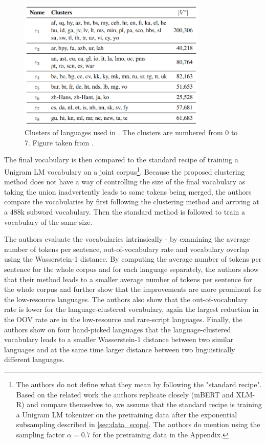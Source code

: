 \begin{figure}[ht]
    \centering
    \includegraphics[width=0.8\textwidth]{img/temp/chung_clusters.png}
    \caption{Clusters of languages used in \cite{chung_improving_2020}. The clusters are numbered from 0 to 7. Figure taken from \cite{chung_improving_2020}.}
    \label{fig:chung_clusters}
\end{figure}

The final vocabulary is then compared to the standard recipe of training a Unigram LM vocabulary on a joint corpus\footnote{The authors do not define what they mean by following the "standard recipe". Based on the related work the authors replicate closely (mBERT and XLM-R) and compare themselves to, we assume that the standard recipe is training a Unigram LM tokenizer on the pretraining data after the exponential subsampling described in \ref{sec:data_scope}. The authors do mention using the sampling factor $\alpha=0.7$ for the pretraining data in the Appendix.}. Because the proposed clustering method does not have a way of controlling the size of the final vocabulary as taking the union inadvertently leads to some tokens being merged, the authors compare the vocabularies by first following the clustering method and arriving at a 488k subword vocabulary. Then the standard method is followed to train a vocabulary of the same size.

The authors evaluate the vocabularies intrinsically - by examining the average number of tokens per sentence, out-of-vocabulary rate and vocabulary overlap using the Wasserstein-1 distance.
By computing the average number of tokens per sentence for the whole corpus and for each language separately, the authors show that their method leads to a smaller average number of tokens per sentence for the whole corpus and further show that the improvements are more prominent for the low-resource languages. The authors also show that the out-of-vocabulary rate is lower for the language-clustered vocabulary, again the largest reduction in the OOV rate are in the low-resource and rare-script languages. Finally, the authors show on four hand-picked languages that the language-clustered vocabulary leads to a smaller Wasserstein-1 distance between two similar languages and at the same time larger distance between two linguistically different languages.

